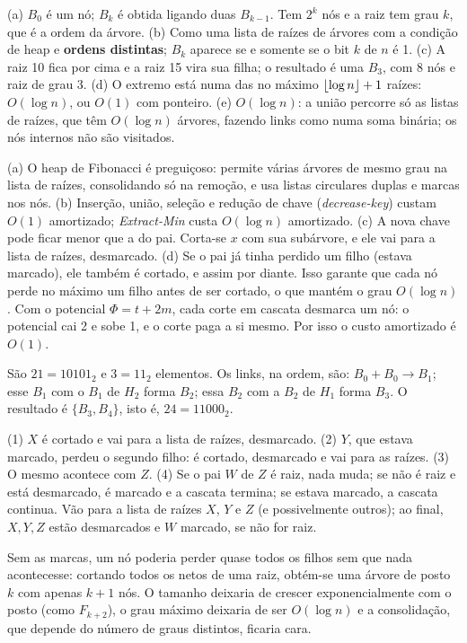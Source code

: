  (a) $B_0$ é um nó; $B_k$ é obtida ligando duas $B_{k-1}$. Tem $2^k$ nós e a raiz tem grau $k$, que é a ordem da árvore. (b) Como uma lista de raízes de árvores com a condição de heap e \textbf{ordens distintas}; $B_k$ aparece se e somente se o bit $k$ de $n$ é 1. (c) A raiz 10 fica por cima e a raiz 15 vira sua filha; o resultado é uma $B_3$, com 8 nós e raiz de grau 3. (d) O extremo está numa das no máximo $\lfloor\log n\rfloor+1$ raízes: $O(\log n)$, ou $O(1)$ com ponteiro. (e) $O(\log n)$: a união percorre só as listas de raízes, que têm $O(\log n)$ árvores, fazendo links como numa soma binária; os nós internos não são visitados.

 (a) O heap de Fibonacci é preguiçoso: permite várias árvores de mesmo grau na lista de raízes, consolidando só na remoção, e usa listas circulares duplas e marcas nos nós. (b) Inserção, união, seleção e redução de chave (\emph{decrease-key}) custam $O(1)$ amortizado; \emph{Extract-Min} custa $O(\log n)$ amortizado. (c) A nova chave pode ficar menor que a do pai. Corta-se $x$ com sua subárvore, e ele vai para a lista de raízes, desmarcado. (d) Se o pai já tinha perdido um filho (estava marcado), ele também é cortado, e assim por diante. Isso garante que cada nó perde no máximo um filho antes de ser cortado, o que mantém o grau $O(\log n)$. Com o potencial $\Phi=t+2m$, cada corte em cascata desmarca um nó: o potencial cai 2 e sobe 1, e o corte paga a si mesmo. Por isso o custo amortizado é $O(1)$.

 São $21=10101_2$ e $3=11_2$ elementos. Os links, na ordem, são: $B_0+B_0\to B_1$; esse $B_1$ com o $B_1$ de $H_2$ forma $B_2$; essa $B_2$ com a $B_2$ de $H_1$ forma $B_3$. O resultado é $\{B_3,B_4\}$, isto é, $24=11000_2$.

 (1) $X$ é cortado e vai para a lista de raízes, desmarcado. (2) $Y$, que estava marcado, perdeu o segundo filho: é cortado, desmarcado e vai para as raízes. (3) O mesmo acontece com $Z$. (4) Se o pai $W$ de $Z$ é raiz, nada muda; se não é raiz e está desmarcado, é marcado e a cascata termina; se estava marcado, a cascata continua. Vão para a lista de raízes $X$, $Y$ e $Z$ (e possivelmente outros); ao final, $X,Y,Z$ estão desmarcados e $W$ marcado, se não for raiz.

 Sem as marcas, um nó poderia perder quase todos os filhos sem que nada acontecesse: cortando todos os netos de uma raiz, obtém-se uma árvore de posto $k$ com apenas $k+1$ nós. O tamanho deixaria de crescer exponencialmente com o posto (como $F_{k+2}$), o grau máximo deixaria de ser $O(\log n)$ e a consolidação, que depende do número de graus distintos, ficaria cara.

